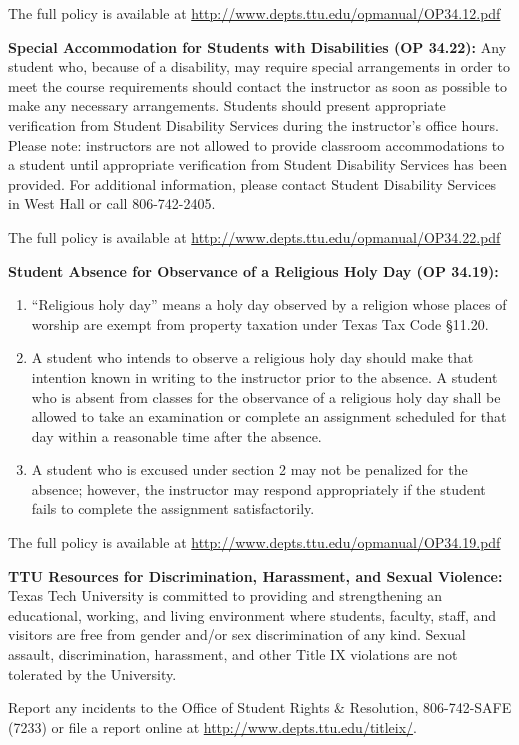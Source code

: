 \documentclass[11pt]{NSF}
\def\ben{\begin{enumerate}}
\def\een{\end{enumerate}}
\def\i{\item{}}
\begin{document}
The full policy is available at
\url{http://www.depts.ttu.edu/opmanual/OP34.12.pdf} 

{\bf Special Accommodation for Students with Disabilities 
(OP 34.22):} 
Any student who, because of
a disability, may require special arrangements in order to meet the
course requirements should contact the instructor as soon as possible
to make any necessary arrangements. Students should present
appropriate verification from Student Disability Services during the
instructor's office hours. Please note: instructors are not allowed to
provide classroom accommodations to a student until appropriate
verification from Student Disability Services has been provided. For
additional information, please contact Student Disability Services in
West Hall or call 806-742-2405.  

The full policy is available at
\url{http://www.depts.ttu.edu/opmanual/OP34.22.pdf}

{\bf Student Absence for
Observance of a Religious Holy Day (OP 34.19):}

\ben
\i “Religious holy day”
means a holy day observed by a religion whose places of worship are
exempt from property taxation under Texas Tax Code §11.20.  

\i A student who intends to observe a religious holy day should make that
intention known in writing to the instructor prior to the absence. A
student who is absent from classes for the observance of a religious
holy day shall be allowed to take an examination or complete an
assignment scheduled for that day within a reasonable time after the
absence.  

\i A student who is excused under section 2 may not be
penalized for the absence; however, the instructor may respond
appropriately if the student fails to complete the assignment
satisfactorily.  
\een

The full policy is available at
\url{http://www.depts.ttu.edu/opmanual/OP34.19.pdf}

{\bf TTU Resources for Discrimination, Harassment, and Sexual
Violence:}
Texas Tech University is committed to providing and strengthening an
educational, working, and living environment where students, faculty,
staff, and visitors are free from gender and/or sex discrimination of
any kind. Sexual assault, discrimination, harassment, and other Title
IX violations are not tolerated by the University. 

Report any
incidents to the Office of Student Rights \& Resolution, 806-742-SAFE
(7233) or file a report online at 
\url{http://www.depts.ttu.edu/titleix/}. 
\end{document}
